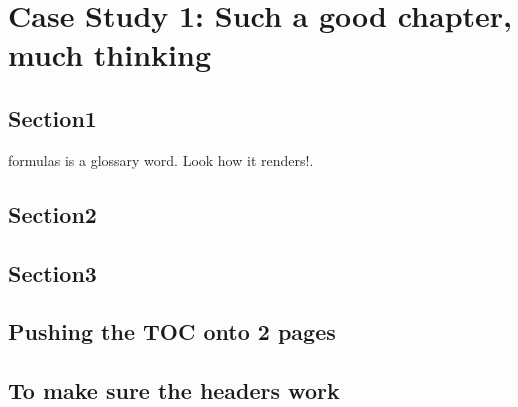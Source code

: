\chapter{Case Study 1: Such a good chapter, much thinking }
\section{Section1}
 \Glspl{formula} is a glossary word.  Look how it renders!.
\section{Section2}
\section{Section3}
\section{Pushing the TOC onto 2 pages}
\section{To make sure the headers work}